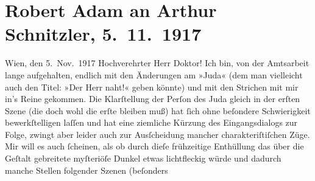 

         
         \renewcommand{\erwaehntePersonen}{Personen: Robert Adam, Titus Livius}
         \renewcommand{\erwaehnteOrte}{Orte: Griechenland, Ostia Antica, Rom, Wien}
         \renewcommand{\erwaehnteWerke}{Werke: Das Ende des Judas}
               \section[Robert Adam an Arthur Schnitzler, 5. 11. 1917]{ Robert Adam an Arthur Schnitzler, 5. 11. 1917}\nopagebreak{}\rehead{ }\begin{ledgroupsized}[t]{13cm}\normalsize\beginnumbering \toendnotes[C]{\smallbreak\pagebreak[2]} 
\pstart
           \raggedleft{}{\pb}Wien, den 5. Nov. 1917\pend
           \pstart\center{}Hochverehrter Herr Doktor!\pend\pstart
           Ich bin, von der Amtsarbeit lange aufgehalten, endlich mit den Änderungen am »Juda« (dem man vielleicht auch den Titel: »Der
               Herr naht!« geben könnte) und mit den Strichen mit mir in’s Reine gekommen. Die
               Klarſtellung der Perſon des Juda gleich in der erſten Szene (die doch wohl die erſte
               bleiben muß) hat ſich ohne beſondere Schwierigkeit bewerkſtelligen laſſen und hat
               eine ziemliche Kürzung des Eingangsdialogs zur Folge, zwingt aber leider auch zur
               Ausſcheidung mancher charakteriſtiſchen Züge. Mir will es auch ſcheinen,  als ob durch dieſe frühzeitige Enthüllung das über
               die Geſtalt gebreitete myſteriöſe Dunkel etwas lichtfleckig würde und  dadurch manche Stellen folgender Szenen (beſonders

\end{ledgroupsized}

